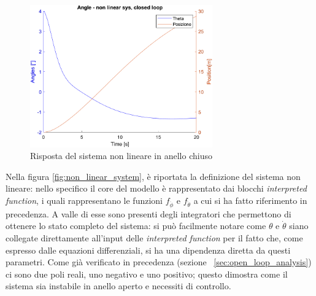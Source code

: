 \begin{figure}[H]
	\centering   	
	\includegraphics[width=0.7\textwidth]{Immagini/closed_loop_non_linear.png}
	\caption{Risposta del sistema non lineare in anello chiuso}
	\label{fig:closed_loop_non_linear_response}
\end{figure}

Nella figura \ref{fig:non_linear_system}, è riportata la definizione del sistema non lineare: nello specifico il core del modello è rappresentato dai blocchi \textit{interpreted function}, i quali rappresentano le funzioni  $f_{\ddot{\phi}}$ e $f_{\ddot{\theta}}$ a cui si ha fatto riferimento in precedenza.
A valle di esse sono presenti degli integratori che permettono di ottenere lo stato completo del sistema: si può facilmente notare come $\theta$ e $\dot{\theta}$ siano collegate direttamente all'input delle \textit{interpreted function} per il fatto che, come espresso dalle equazioni differenziali, si ha una dipendenza diretta da questi parametri.
Come già verificato in precedenza (sezione ~\ref{sec:open_loop_analysis}) ci sono due poli reali, uno negativo e uno positivo; questo dimostra come il sistema sia instabile in anello aperto e necessiti di controllo.

